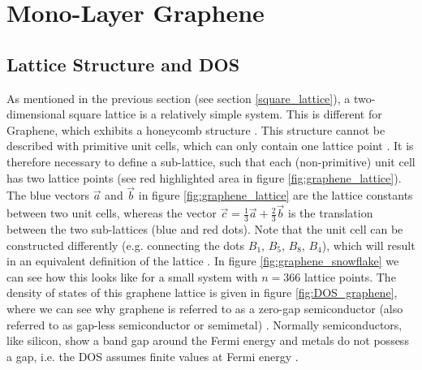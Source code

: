 


\section{Mono-Layer Graphene}\label{monolayer_graphene}

\subsection{Lattice Structure and DOS}

As mentioned in the previous section (see section \ref{square_lattice}), a two-dimensional square lattice is a relatively simple system. This is different for Graphene, which exhibits a honeycomb structure \cite{Katsnelson2020}. This structure cannot be described with primitive unit cells, which can only contain one lattice point \cite{Hofmann2015}. It is therefore necessary to define a sub-lattice, such that each (non-primitive) unit cell has two lattice points (see red highlighted area in figure \ref{fig:graphene_lattice}). The blue vectors $\Vec{a}$ and $\Vec{b}$ in figure \ref{fig:graphene_lattice} are the lattice constants between two unit cells, whereas the vector $\Vec{c} = \frac{1}{3}\Vec{a}+\frac{2}{3}\Vec{b}$ is the translation between the two sub-lattices (blue and red dots). Note that the unit cell can be constructed differently (e.g. connecting the dots $B_1$, $B_5$, $B_8$, $B_4$), which will result in an equivalent definition of the lattice \cite{Hofmann2015}. In figure \ref{fig:graphene_snowflake} we can see how this looks like for a small system with $n=366$ lattice points. The density of states of this graphene lattice is given in figure \ref{fig:DOS_graphene}, where we can see why graphene is referred to as a zero-gap semiconductor (also referred to as gap-less semiconductor or semimetal) \cite{Radamson2017}. Normally semiconductors, like silicon, show a band gap around the Fermi energy and metals do not possess a gap, i.e. the DOS assumes finite values at Fermi energy \cite{Radamson2017}. 

